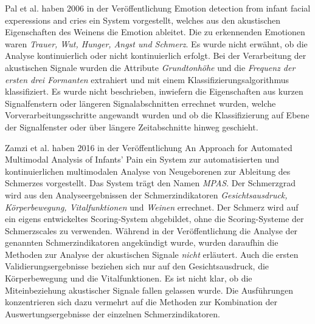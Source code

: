 
Pal et al.  haben 2006 in der Veröffentlichung \glqq Emotion detection from infant facial experessions and cries\grqq{} \cite{palEmotion} ein System vorgestellt, welches aus den akustischen Eigenschaften des Weinens die Emotion ableitet. Die zu erkennenden Emotionen waren \emph{Trauer, Wut, Hunger, Angst und Schmerz}. Es wurde nicht erwähnt, ob die Analyse kontinuierlich oder nicht kontinuierlich erfolgt. Bei der Verarbeitung der akustischen Signale wurden die Attribute \emph{Grundtonhöhe} und die \emph{Frequenz der ersten drei Formanten} extrahiert und mit einem Klassifizierungsalgorithmus klassifiziert. Es wurde nicht beschrieben, inwiefern die Eigenschaften aus kurzen Signalfenstern oder längeren Signalabschnitten errechnet wurden, welche Vorverarbeitungsschritte angewandt wurden und ob die Klassifizierung auf Ebene der Signalfenster oder über längere Zeitabschnitte hinweg geschieht.

Zamzi et al.  haben 2016 in der Veröffentlichung \glqq An Approach for Automated Multimodal Analysis of Infants' Pain\grqq{} \cite{zamziMultimodal} ein System zur automatisierten und kontinuierlichen multimodalen Analyse von Neugeborenen zur Ableitung des Schmerzes vorgestellt. Das System trägt den Namen \emph{MPAS}. Der Schmerzgrad wird aus den Analyseergebnissen der Schmerzindikatoren  \emph{Gesichtsausdruck, Körperbewegung, Vitalfunktionen} und \emph{Weinen} errechnet. Der Schmerz wird auf ein eigens entwickeltes Scoring-System abgebildet, ohne die Scoring-Systeme der Schmerzscales zu verwenden. Während in der Veröffentlichung die Analyse der genannten Schmerzindikatoren angekündigt wurde, wurden daraufhin die Methoden zur Analyse der akustischen Signale \emph{nicht} erläutert. Auch die ersten Validierungsergebnisse beziehen sich nur auf den Gesichtsausdruck, die Körperbewegung und die Vitalfunktionen. Es ist nicht klar, ob die Miteinbeziehung akustischer Signale fallen gelassen wurde. Die Ausführungen konzentrieren sich dazu vermehrt auf die Methoden zur Kombination der Auswertungsergebnisse der einzelnen Schmerzindikatoren.

